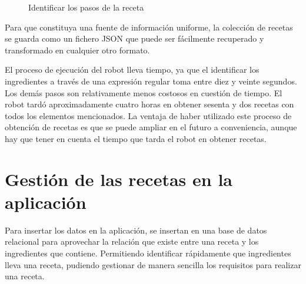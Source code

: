 \begin{figure}[h!]
    \centering
    \caption{Identificar los pasos de la receta}
    \label{fig:steps}
\end{figure}


Para que constituya una fuente de información uniforme, la colección de recetas se guarda como un fichero \gls{JSON} que puede ser fácilmente recuperado y transformado en cualquier otro formato.

El proceso de ejecución del robot lleva tiempo, ya que el identificar los ingredientes a través de una expresión regular toma entre diez y veinte segundos. Los demás pasos son relativamente menos costosos en cuestión de tiempo. El robot tardó aproximadamente cuatro horas en obtener sesenta y dos recetas con todos los elementos mencionados. La ventaja de haber utilizado este proceso de obtención de recetas es que se puede ampliar en el futuro a conveniencia, aunque hay que tener en cuenta el tiempo que tarda el robot en obtener recetas.

\section{Gestión de las recetas en la aplicación}

Para insertar los datos en la aplicación, se insertan en una base de datos relacional para aprovechar la relación que existe entre una receta y los ingredientes que contiene. Permitiendo identificar rápidamente que ingredientes lleva una receta, pudiendo gestionar de manera sencilla los requisitos para realizar una receta. 

